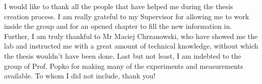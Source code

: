 \documentclass[12pt,twoside]{report}
\numberwithin{equation}{subsection}
\begin{document}
I would like to thank all the people that have helped me during the thesis creation process. I am really grateful to my Supervisor for allowing me to work inside the group and for an opened chapter to fill the new information in. Further, I am truly thankful to Mr Maciej Chrzanowski, who have showed me the lab and instructed me with a great amount of technical knowledge, without which the thesis wouldn't have been done. Last but not least, I am indebted to the group of Prof. Popko for making many of the experiments and measurements available. To whom I did not include, thank you!

\tableofcontents
\listoffigures 
\listoftables














\printbibliography
\end{document}
